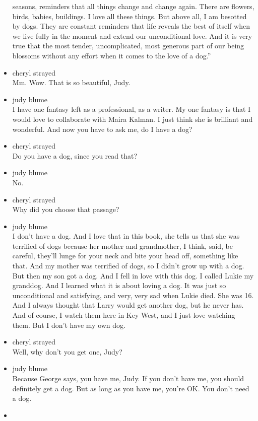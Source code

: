 \begin{itemize}
  seasons, reminders that all things change and change again. There are
  flowers, birds, babies, buildings. I love all these things. But above
  all, I am besotted by dogs. They are constant reminders that life
  reveals the best of itself when we live fully in the moment and extend
  our unconditional love. And it is very true that the most tender,
  uncomplicated, most generous part of our being blossoms without any
  effort when it comes to the love of a dog.''
\item
  cheryl strayed\\
  Mm. Wow. That is so beautiful, Judy.
\item
  judy blume\\
  I have one fantasy left as a professional, as a writer. My one fantasy
  is that I would love to collaborate with Maira Kalman. I just think
  she is brilliant and wonderful. And now you have to ask me, do I have
  a dog?
\item
  cheryl strayed\\
  Do you have a dog, since you read that?
\item
  judy blume\\
  No.
\item
  cheryl strayed\\
  Why did you choose that passage?
\item
  judy blume\\
  I don't have a dog. And I love that in this book, she tells us that
  she was terrified of dogs because her mother and grandmother, I think,
  said, be careful, they'll lunge for your neck and bite your head off,
  something like that. And my mother was terrified of dogs, so I didn't
  grow up with a dog. But then my son got a dog. And I fell in love with
  this dog. I called Lukie my granddog. And I learned what it is about
  loving a dog. It was just so unconditional and satisfying, and very,
  very sad when Lukie died. She was 16. And I always thought that Larry
  would get another dog, but he never has. And of course, I watch them
  here in Key West, and I just love watching them. But I don't have my
  own dog.
\item
  cheryl strayed\\
  Well, why don't you get one, Judy?
\item
  judy blume\\
  Because George says, you have me, Judy. If you don't have me, you
  should definitely get a dog. But as long as you have me, you're OK.
  You don't need a dog.
\item

\end{itemize}
